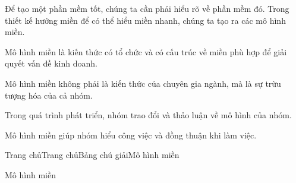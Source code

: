
Để tạo một phần mềm tốt, chúng ta cần phải hiểu rõ về phần mềm đó. Trong thiết kế hướng miền để có thể hiểu miền nhanh, chúng ta tạo ra các mô hình miền.

Mô hình miền là kiến thức có tổ chức và có cấu trúc về miền phù hợp để giải quyết vấn đề kinh doanh.

Mô hình miền không phải là kiến thức của chuyên gia ngành, mà là sự trừu tượng hóa của cả nhóm.

Trong quá trình phát triển, nhóm trao đổi và thảo luận về mô hình của nhóm.

Mô hình miền giúp nhóm hiểu công việc và đồng thuận khi làm việc.












Trang chủTrang chủBảng chú giảiMô hình miền

Mô hình miền


